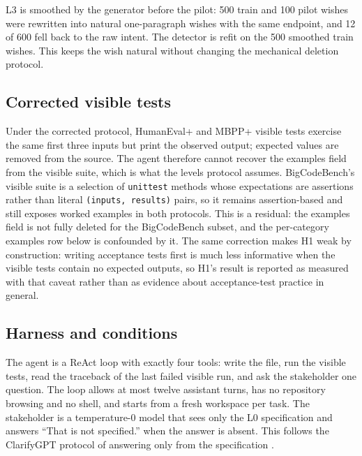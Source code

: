 \documentclass{article}
\begin{document}
L3 is smoothed by the generator before the pilot: 500 train and 100 pilot wishes were
rewritten into natural one-paragraph wishes with the same endpoint, and 12 of 600 fell back to
the raw intent. The detector is refit on the 500 smoothed train wishes. This keeps the wish
natural without changing the mechanical deletion protocol.

\subsection{Corrected visible tests}

Under the corrected protocol, HumanEval+ and MBPP+ visible tests exercise the same first three
inputs but print the observed output; expected values are removed from the source. The agent
therefore cannot recover the examples field from the visible suite, which is what the levels
protocol assumes. BigCodeBench's visible suite is a selection of \texttt{unittest} methods
whose expectations are assertions rather than literal \texttt{(inputs, results)} pairs, so it
remains assertion-based and still exposes worked examples in both protocols. This is a
residual: the examples field is not fully deleted for the BigCodeBench subset, and the
per-category examples row below is confounded by it. The same correction makes H1 weak by
construction: writing acceptance tests first is much less informative when the visible tests
contain no expected outputs, so H1's result is reported as measured with that caveat rather
than as evidence about acceptance-test practice in general.

\subsection{Harness and conditions}

The agent is a ReAct loop with exactly four tools: write the file, run the visible tests, read
the traceback of the last failed visible run, and ask the stakeholder one question. The loop
allows at most twelve assistant turns, has no repository browsing and no shell, and starts
from a fresh workspace per task. The stakeholder is a temperature-0 model that sees only the
L0 specification and answers ``That is not specified.'' when the answer is absent. This
follows the ClarifyGPT protocol of answering only from the specification
\citep{mu2023clarifygpt}.
\end{document}
